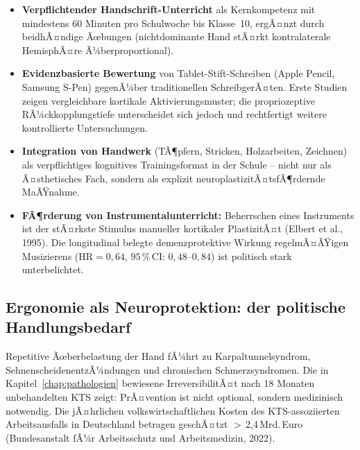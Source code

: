 ﻿\documentclass[12pt,a4paper]{report}
\theoremstyle{plain}
\theoremstyle{definition}
\theoremstyle{remark}
\begin{document}
\begin{itemize}
\item \textbf{Verpflichtender Handschrift-Unterricht} als Kernkompetenz
  mit mindestens 60 Minuten pro Schulwoche bis Klasse~10, ergÃ¤nzt
  durch beidhÃ¤ndige Ãœbungen (nichtdominante Hand stÃ¤rkt kontralaterale
  HemisphÃ¤re Ã¼berproportional).
\item \textbf{Evidenzbasierte Bewertung} von Tablet-Stift-Schreiben
  (Apple Pencil, Samsung S-Pen) gegenÃ¼ber traditionellen SchreibgerÃ¤ten.
  Erste Studien zeigen vergleichbare kortikale Aktivierungsmuster;
  die propriozeptive RÃ¼ckkopplungstiefe unterscheidet sich jedoch und
  rechtfertigt weitere kontrollierte Untersuchungen.
\item \textbf{Integration von Handwerk} (TÃ¶pfern, Stricken, Holzarbeiten,
  Zeichnen) als verpflichtiges kognitives Trainingsformat in der Schule --
  nicht nur als Ã¤sthetisches Fach, sondern als explizit
  neuroplastizitÃ¤tsfÃ¶rdernde MaÃŸnahme.
\item \textbf{FÃ¶rderung von Instrumentalunterricht:} Beherrschen eines
  Instruments ist der stÃ¤rkste Stimulus manueller kortikaler PlastizitÃ¤t
  (Elbert et al., 1995). Die longitudinal belegte demenzprotektive
  Wirkung regelmÃ¤ÃŸigen Musizierens ($\text{HR} = 0{,}64$,
  $95\,\%$\,CI: $0{,}48$--$0{,}84$) ist politisch stark unterbelichtet.
\end{itemize}

\subsection{Ergonomie als Neuroprotektion: der politische Handlungsbedarf}

Repetitive Ãœberbelastung der Hand fÃ¼hrt zu Karpaltunnelsyndrom,
SehnenscheidenentzÃ¼ndungen und chronischen Schmerzsyndromen. Die in
Kapitel~\ref{chap:pathologien} bewiesene IrreversibilitÃ¤t nach 18 Monaten
unbehandelten KTS zeigt: PrÃ¤vention ist nicht optional, sondern medizinisch
notwendig. Die jÃ¤hrlichen volkswirtschaftlichen Kosten des KTS-assoziierten
Arbeitsausfalls in Deutschland betragen geschÃ¤tzt $>$\,2,4\,Mrd.\,Euro
(Bundesanstalt fÃ¼r Arbeitsschutz und Arbeitsmedizin, 2022).
\end{document}
